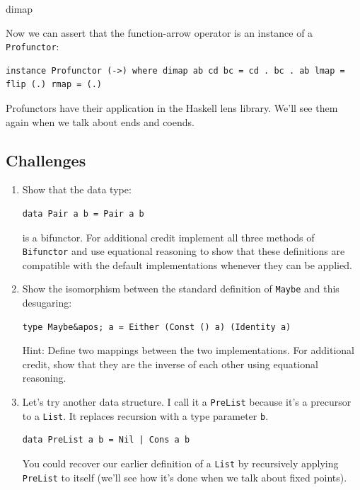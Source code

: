 dimap

Now we can assert that the function-arrow operator is an instance of a
\texttt{Profunctor}:

\begin{verbatim}
instance Profunctor (->) where dimap ab cd bc = cd . bc . ab lmap = flip (.) rmap = (.)
\end{verbatim}

Profunctors have their application in the Haskell lens library. We'll
see them again when we talk about ends and coends.

\subsection{Challenges}\label{challenges}

\begin{enumerate}
\item
  Show that the data type:

\begin{verbatim}
data Pair a b = Pair a b
\end{verbatim}

  is a bifunctor. For additional credit implement all three methods of
  \texttt{Bifunctor} and use equational reasoning to show that these
  definitions are compatible with the default implementations whenever
  they can be applied.
\item
  Show the isomorphism between the standard definition of \texttt{Maybe}
  and this desugaring:

\begin{verbatim}
type Maybe&apos; a = Either (Const () a) (Identity a)
\end{verbatim}

  Hint: Define two mappings between the two implementations. For
  additional credit, show that they are the inverse of each other using
  equational reasoning.
\item
  Let's try another data structure. I call it a \texttt{PreList} because
  it's a precursor to a \texttt{List}. It replaces recursion with a type
  parameter \texttt{b}.

\begin{verbatim}
data PreList a b = Nil | Cons a b
\end{verbatim}

  You could recover our earlier definition of a \texttt{List} by
  recursively applying \texttt{PreList} to itself (we'll see how it's
  done when we talk about fixed points).


\end{enumerate}
